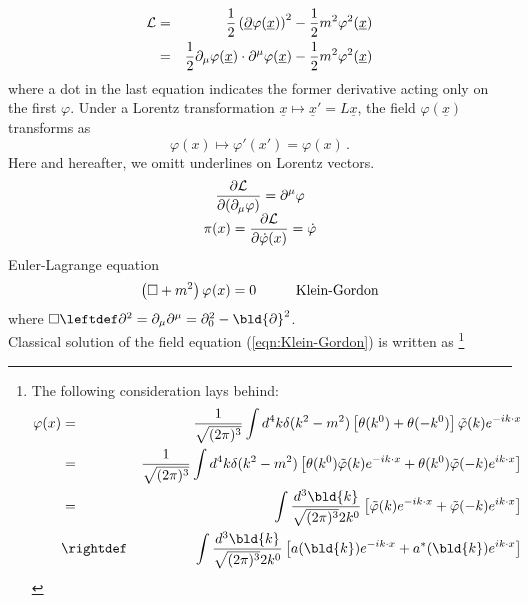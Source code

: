 \begin{eqnarray}
{\cal L} &=& \frac{1}{2} 
\left( \underline{\partial} \varphi(\underline{x}) \right)^2
-\frac{1}{2} m^2 \varphi^2(\underline{x})
\nonumber\\
&=& \frac{1}{2} 
\partial_\mu \varphi(\underline{x})\cdot \partial^\mu \varphi(\underline{x})
-\frac{1}{2} m^2 \varphi^2(\underline{x})
\label{eqn:RSCLagrangiandensity}
\end{eqnarray}
where a dot in the last equation indicates the former derivative acting only on the first $\varphi$.
Under a Lorentz transformation $\underline{x} \mapsto \underline{x}' = L\underline{x}$,
the field $\varphi(\underline{x})$ transforms as
\begin{equation}
\varphi(x) \mapsto \varphi'(x') = \varphi(x)\,.
\end{equation}
Here and hereafter, we omitt underlines on Lorentz vectors.
\begin{equation}
\begin{array}{c}
\displaystyle
\frac{\partial {\cal L}}{\partial(\partial_\mu \varphi)} = \partial^\mu \varphi
\\
\displaystyle
\pi(x) = \frac{ \partial {\cal L}}{ \partial \dot{\varphi}(x) } = \dot{\varphi}
\end{array}
\end{equation}
Euler-Lagrange equation
\begin{equation}
\left( \Box + m^2 \right) \varphi_{}(x) = 0
\hspace{10mm}
\mbox{Klein-Gordon}
\label{eqn:Klein-Gordon}
\end{equation}
where $\Box \leftdef \partial^2 = \partial_\mu \partial^\mu = \partial_0^2 - \bld{\partial}^2$.\\
Classical solution of the field equation (\ref{eqn:Klein-Gordon}) is written as
\footnote{%
The following consideration lays behind:
\begin{eqnarray*}
\varphi(x)
&=&
\frac{1}{\sqrt{(2\pi)^3}}
\int 
d^4 k
\delta(k^2 - m^2)
\left[
\theta(k^0) + \theta(-k^0)
\right]
\tilde{\varphi} (k)
e^{-i k \cdot x}
\nonumber\\
&=&
\frac{1}{\sqrt{(2\pi)^3}}
\int 
d^4 k
\delta(k^2 - m^2)
\left[
\theta(k^0)
\tilde{\varphi} (k)
e^{-i k \cdot x}
 + \theta(k^0)
\tilde{\varphi} (-k)
e^{i k \cdot x}
\right]
\nonumber\\
&=&
\int 
\frac{d^3 \bld{k}}{\sqrt{(2\pi)^3}2 k^0}
\left[
\tilde{\varphi} (k)
e^{-i k \cdot x}
 + 
\tilde{\varphi} (-k)
e^{i k \cdot x}
\right]
\nonumber\\
&\rightdef&
\int 
\frac{d^3 \bld{k}}{\sqrt{(2\pi)^3}2 k^0}
\left[
a (\bld{k})
e^{-i k \cdot x}
 +
 a^*(\bld{k}) 
e^{i k \cdot x}
\right]
\end{eqnarray*}
}%
